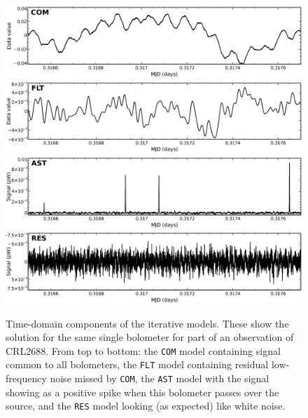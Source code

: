 \documentclass[twoside,11pt]{article}
\renewcommand{\_}{\texttt{\symbol{95}}}
\begin{document}
\begin{figure}
\begin{center}
\includegraphics[width=\linewidth]{sc21_com.eps} \\
\includegraphics[width=\linewidth]{sc21_flt.eps} \\
\includegraphics[width=\linewidth]{sc21_ast.eps} \\
\includegraphics[width=\linewidth]{sc21_res.eps} \\
\caption{Time-domain components of the iterative models. These show the
solution for the same single bolometer for part of an observation of
CRL2688. From top to bottom: the \texttt{COM} model containing signal
common to all bolometers, the \texttt{FLT} model containing residual
low-frequency noise missed by \texttt{COM}, the \texttt{AST} model
with the signal showing as a positive spike when this bolometer passes
over the source, and the \texttt{RES} model looking (as expected) like
white noise. }
\label{fig:itercomp}
\end{center}
\end{figure}
\end{document}
